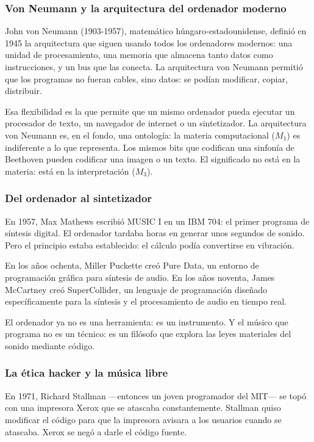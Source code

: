 \documentclass[14pt, a4paper]{article}
\begin{document}
\subsubsection{Von Neumann y la arquitectura del ordenador moderno}
\label{von-neumann}
John von Neumann (1903-1957), matemático húngaro-estadounidense,
definió en 1945 la arquitectura que siguen usando todos los
ordenadores modernos: una unidad de procesamiento, una memoria que
almacena tanto datos como instrucciones, y un bus que las conecta. La
arquitectura von Neumann permitió que los programas no fueran cables,
sino datos: se podían modificar, copiar, distribuir.

Esa flexibilidad es la que permite que un mismo ordenador pueda
ejecutar un procesador de texto, un navegador de internet o un
sintetizador. La arquitectura von Neumann es, en el fondo, una
ontología: la materia computacional (\(M_1\)) es indiferente a lo que
representa. Los mismos bits que codifican una sinfonía de Beethoven
pueden codificar una imagen o un texto. El significado no está en la
materia: está en la interpretación (\(M_3\)).
\subsubsection{Del ordenador al sintetizador}
\label{ordenador-sintetizador}
En 1957, Max Mathews escribió MUSIC I en un IBM 704: el primer
programa de síntesis digital. El ordenador tardaba horas en generar
unos segundos de sonido. Pero el principio estaba establecido: el
cálculo podía convertirse en vibración.

En los años ochenta, Miller Puckette creó Pure Data, un entorno de
programación gráfica para síntesis de audio. En los años noventa,
James McCartney creó SuperCollider, un lenguaje de programación
diseñado específicamente para la síntesis y el procesamiento de audio
en tiempo real.

El ordenador ya no es una herramienta: es un instrumento. Y el músico
que programa no es un técnico: es un filósofo que explora las leyes
materiales del sonido mediante código.
\subsubsection{La ética hacker y la música libre}
\label{etica-hacker-musica}
En 1971, Richard Stallman —entonces un joven programador del MIT— se
topó con una impresora Xerox que se atascaba constantemente. Stallman
quiso modificar el código para que la impresora avisara a los usuarios
cuando se atascaba. Xerox se negó a darle el código fuente.
\end{document}
